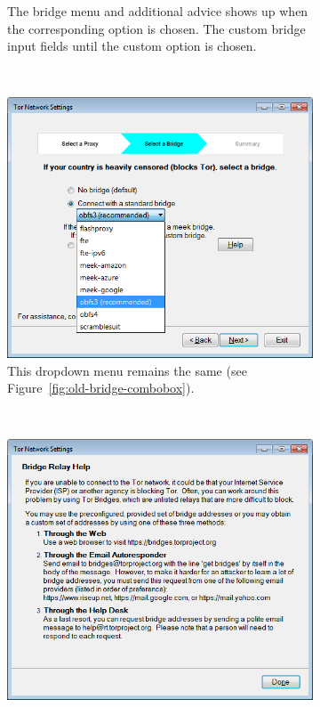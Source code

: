 \documentclass[USenglish,oneside,twocolumn]{article}
\begin{document}
\begin{figure}
\begin{subfigure}[b]{0.30\textwidth}
	\centering\captionsetup{width=1.5\linewidth}%
	\caption{The bridge menu and additional advice shows up when the corresponding option is chosen. The custom bridge input fields until the custom option is chosen.}
	\label{fig:new-bridge}
\end{subfigure}
~~~~~~~~~~
\begin{subfigure}[b]{0.30\textwidth}
	\includegraphics[width=\textwidth]{screenshots/NEW-bridgeSettings-combobox.png}
	\centering\captionsetup{width=1.5\linewidth}%
	\caption{This dropdown menu remains the same (see Figure~\ref{fig:old-bridge-combobox}).}
	\label{fig:new-bridge-combobox}
\end{subfigure}
~~~~~~~~~~~~~~~~~~~~~~~~~
\begin{subfigure}[b]{0.30\textwidth}
	\includegraphics[width=\textwidth]{screenshots/NEW-bridgeHelp.png}

\end{subfigure}
\end{figure}
\end{document}
